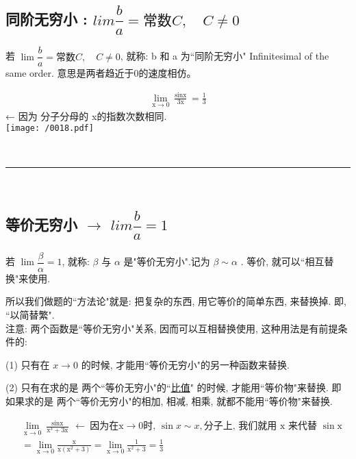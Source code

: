 \documentclass[UTF8]{ctexart}
\begin{document}
\subsection{同阶无穷小 : $lim \dfrac{b} {a}= \text{常数}C, \quad C \ne 0$} 

若 $\lim \dfrac{b} {a}= \text{常数}C, \quad C \ne 0 $, 就称: b 和 a 为``同阶无穷小" Infinitesimal of the same order. 意思是两者趋近于0的速度相仿。

\begin{tcolorbox}[title = {例},boxrule={0.1em},colframe={black!10}, colback={black!3},colbacktitle={black!10},coltitle={black}]
\begin{align*}  %
	\lim_{\text{x}\rightarrow 0}\frac{\sin\text{x}}{3\text{x}}=\frac{1}{3}  
\end{align*} ← 因为 分子分母的 x的指数次数相同. \\

\texttt{[image: /0018.pdf]}
\end{tcolorbox}


~\\
\hrule
~\\


\subsection{等价无穷小 $\to$ $lim \dfrac{b} {a}=1$} 

若 $\lim \dfrac{\beta} {\alpha} = 1$, 就称: $\beta$ 与 $\alpha$ 是"等价无穷小".记为  $\beta \sim \alpha$ . 等价, 就可以``相互替换"来使用. 

所以我们做题的``方法论"就是: 把复杂的东西, 用它等价的简单东西, 来替换掉. 即, ``以简替繁". \\

注意: 两个函数是``等价无穷小"关系, 因而可以互相替换使用, 这种用法是有前提条件的:

(1) 只有在  $x \to 0$  的时候, 才能用``等价无穷小"的另一种函数来替换.

(2) 只有在求的是 两个``等价无穷小"的``\underline{比值}" 的时候, 才能用``等价物"来替换. 即如果求的是 两个``等价无穷小"的相加, 相减, 相乘, 就都不能用``等价物"来替换. \\

\begin{tcolorbox}[title = {例},boxrule={0.1em},colframe={black!10}, colback={black!3},colbacktitle={black!10},coltitle={black}]
\begin{align*}  %
	&\lim_{\text{x}\rightarrow 0}\frac{\sin\text{x}}{\text{x}^3+3\text{x}}\ \gets \ \text{因为在x}\rightarrow 0\text{时,\ }\sin x \sim x, \text{分子上,\ 我们就用\ x\ 来代替\ }\sin\text{x}\\
	&=\lim_{\text{x}\rightarrow 0}\frac{\text{x}}{\text{x}\left( \text{x}^2+3 \right)}=\lim_{\text{x}\rightarrow 0}\frac{1}{\text{x}^2+3}=\frac{1}{3}
\end{align*}
\end{tcolorbox}
\end{document}
